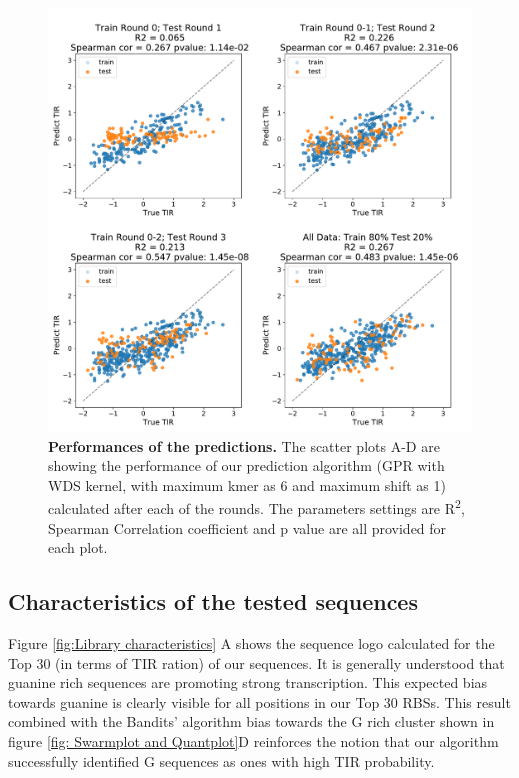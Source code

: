 \documentclass{article}
\begin{document}
\begin{figure}[!ht]
    \centering
    \includegraphics[scale=0.4]{plots/Main_Paper/scatter_abc1_FF.pdf}
    \caption{\textbf{Performances of the predictions.} The scatter plots A-D are showing the performance of our prediction algorithm (GPR with WDS kernel, with maximum kmer as 6 and maximum shift as 1) calculated after each of the rounds.
    The parameters settings are 
    R\textsuperscript{2}, Spearman Correlation coefficient and p value are all provided for each plot.}
    \label{fig: Scatterplot}
\end{figure}

\subsection{Characteristics of the tested sequences}

Figure \ref{fig:Library characteristics} A shows the sequence logo calculated for the Top 30 (in terms of TIR ration) of our sequences.
It is generally understood that guanine rich sequences are promoting strong transcription.
This expected bias towards guanine is clearly visible for all positions in our Top 30 RBSs.
This result combined with the Bandits' algorithm bias towards the G rich cluster shown in figure \ref{fig: Swarmplot and Quantplot}D reinforces the notion that our algorithm successfully identified G sequences as ones with high TIR probability.
\end{document}
